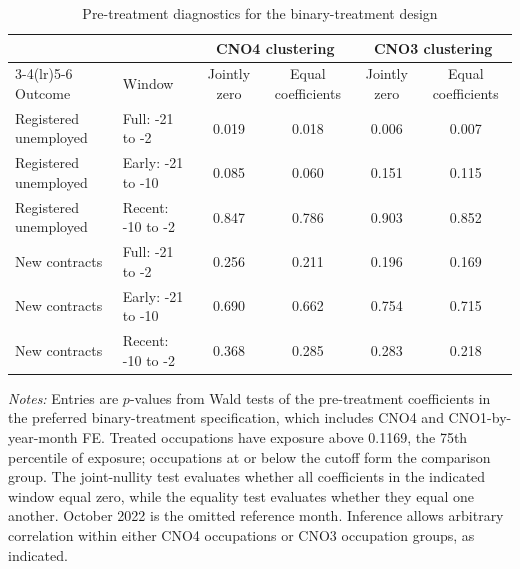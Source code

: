 \begin{table}[H]
\centering
\caption{Pre-treatment diagnostics for the binary-treatment design}
\label{tab:v1_binary_pretrends}
\begin{threeparttable}
\scriptsize
\setlength{\tabcolsep}{4pt}
\begin{tabular}{llcccc}
\toprule
& & \multicolumn{2}{c}{CNO4 clustering} & \multicolumn{2}{c}{CNO3 clustering} \\
\cmidrule(lr){3-4}\cmidrule(lr){5-6}
Outcome & Window & Jointly zero & Equal coefficients & Jointly zero & Equal coefficients \\
\midrule
Registered unemployed & Full: -21 to -2 & 0.019 & 0.018 & 0.006 & 0.007 \\
Registered unemployed & Early: -21 to -10 & 0.085 & 0.060 & 0.151 & 0.115 \\
Registered unemployed & Recent: -10 to -2 & 0.847 & 0.786 & 0.903 & 0.852 \\
\addlinespace
New contracts & Full: -21 to -2 & 0.256 & 0.211 & 0.196 & 0.169 \\
New contracts & Early: -21 to -10 & 0.690 & 0.662 & 0.754 & 0.715 \\
New contracts & Recent: -10 to -2 & 0.368 & 0.285 & 0.283 & 0.218 \\
\bottomrule
\end{tabular}
\begin{tablenotes}[flushleft]
\footnotesize
\item \emph{Notes:} Entries are $p$-values from Wald tests of the pre-treatment coefficients in the preferred binary-treatment specification, which includes CNO4 and CNO1-by-year-month FE. Treated occupations have exposure above 0.1169, the 75th percentile of exposure; occupations at or below the cutoff form the comparison group. The joint-nullity test evaluates whether all coefficients in the indicated window equal zero, while the equality test evaluates whether they equal one another. October 2022 is the omitted reference month. Inference allows arbitrary correlation within either CNO4 occupations or CNO3 occupation groups, as indicated.
\end{tablenotes}
\end{threeparttable}
\end{table}
